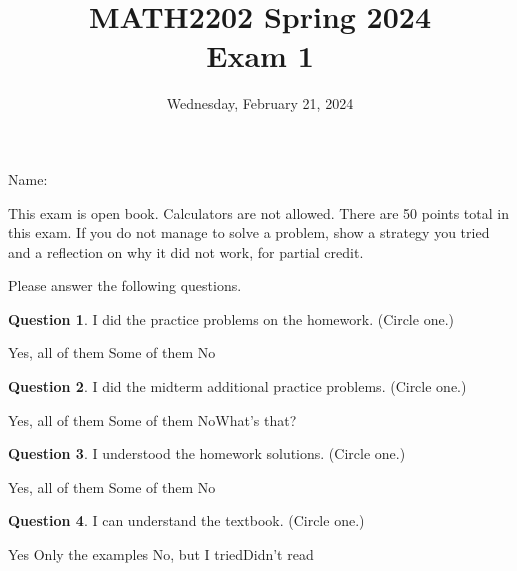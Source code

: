 \documentclass[11pt,oneside]{amsart}
\title{MATH2202 Spring 2024\\
Exam 1}
\author{Wednesday, February 21, 2024}
\theoremstyle{definition}
\newtheorem{question}{Question}
\theoremstyle{plain}
\begin{document}
\maketitle

Name: \underline{\hspace{6cm}}

This exam is open book. Calculators are not allowed. There are 50 points total in this exam. If you do not manage to solve a problem, show a strategy you tried and a reflection on why it did not work, for partial credit.

\vskip 2cm

Please answer the following questions.

\begin{question}
  I did the practice problems on the homework. (Circle one.)

  \hspace{1.5cm}Yes, all of them\hspace{1.5cm} Some of them\hspace{1.5cm} No
\end{question}

\begin{question}
  I did the midterm additional practice problems. (Circle one.)

  \hspace{1.5cm}Yes, all of them\hspace{1.5cm} Some of them\hspace{1.5cm} No\hspace{1.5cm}What's that?
\end{question}

\begin{question}
  I understood the homework solutions. (Circle one.)

  \hspace{1.5cm}Yes, all of them\hspace{1.5cm} Some of them\hspace{1.5cm} No
\end{question}

\begin{question}
  I can understand the textbook. (Circle one.)

  \hspace{1.5cm}Yes\hspace{1.5cm} Only the examples\hspace{1.5cm} No, but I tried\hspace{1.5cm}Didn't read
\end{question}
\end{document}
